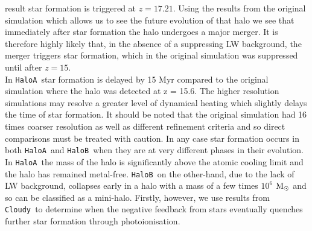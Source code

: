\documentclass[graphics, twocolumn, usenatbib]{mn2e}
\newcommand{\cloudy}{\texttt{Cloudy~}}
\newcommand{\msolar} {$\rm{M_{\odot}}~$}
\newcommand{\ha} {\texttt{HaloA~}}
\newcommand{\hb} {\texttt{HaloB~}}
\begin{document}
result star formation is triggered at $z = 17.21$. Using the results from the original simulation
which allows us to see the future evolution of that halo we see that immediately after star formation
the halo undergoes a major merger. It is therefore highly likely that, in the absence of a suppressing
LW background, the merger triggers star formation, which in the original simulation was
suppressed until after $z = 15$. \\
\indent In \ha star formation is delayed by 15 Myr compared to the original
simulation where the halo was detected at z = 15.6. The higher resolution simulations may
resolve a greater level of dynamical heating which slightly delays the time of star formation. It
should be noted that the original simulation had 16 times coarser resolution as well as different
refinement criteria and so direct comparisons must be treated with caution. In any case star
formation occurs in both \ha and \hb when they are at very different phases in their evolution.
In \ha the mass of the halo is significantly above the atomic cooling limit and the halo has
remained metal-free. \hb on the other-hand, due to the lack of LW background, collapses early in a
halo with a mass of a few times $10^6$ \msolar and so can be classified as a mini-halo. Firstly,
however, we use results from \cloudy to determine when the negative feedback from stars eventually
quenches further star formation through photoionisation. 
\end{document}
